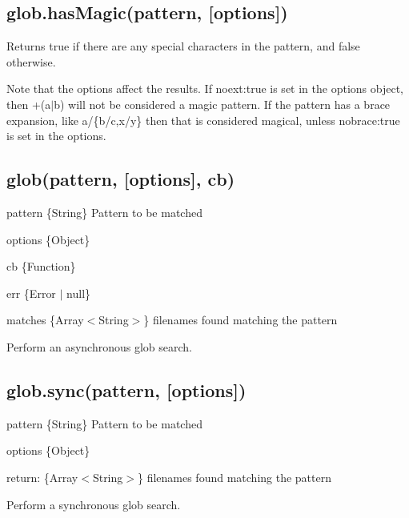 \subsection*{glob.\+has\+Magic(pattern, \mbox{[}options\mbox{]})}

Returns {\ttfamily true} if there are any special characters in the pattern, and {\ttfamily false} otherwise.

Note that the options affect the results. If {\ttfamily noext\+:true} is set in the options object, then {\ttfamily +(a$\vert$b)} will not be considered a magic pattern. If the pattern has a brace expansion, like {\ttfamily a/\{b/c,x/y\}} then that is considered magical, unless {\ttfamily nobrace\+:true} is set in the options.

\subsection*{glob(pattern, \mbox{[}options\mbox{]}, cb)}


\begin{DoxyItemize}
\item {\ttfamily pattern} \{String\} Pattern to be matched
\item {\ttfamily options} \{Object\}
\item {\ttfamily cb} \{Function\}
\begin{DoxyItemize}
\item {\ttfamily err} \{Error $\vert$ null\}
\item {\ttfamily matches} \{Array$<$\+String$>$\} filenames found matching the pattern
\end{DoxyItemize}
\end{DoxyItemize}

Perform an asynchronous glob search.

\subsection*{glob.\+sync(pattern, \mbox{[}options\mbox{]})}


\begin{DoxyItemize}
\item {\ttfamily pattern} \{String\} Pattern to be matched
\item {\ttfamily options} \{Object\}
\item return\+: \{Array$<$\+String$>$\} filenames found matching the pattern
\end{DoxyItemize}

Perform a synchronous glob search.

